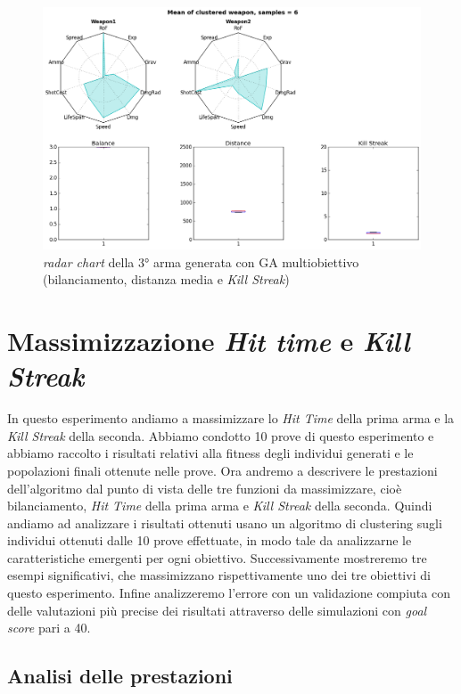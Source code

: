 \documentclass[12pt, italian]{toptesi}
\begin{document}
\begin{figure}[tp]
\centering
\includegraphics[width=1.0\textwidth]{rad_dist_kill_3}
\caption{\emph{radar chart} della 3°  arma generata con GA multiobiettivo (bilanciamento, distanza media e \emph{Kill Streak})}
\label{fig:rad_dist_kill_3}
\end{figure}

\section{Massimizzazione \emph{Hit time} e \emph{Kill Streak}}
\label{sec:delta_kill}

In questo esperimento andiamo a massimizzare lo \emph{Hit Time} della prima arma e la \emph{Kill Streak} della seconda.
Abbiamo condotto 10 prove di questo esperimento e abbiamo raccolto i risultati relativi alla fitness degli individui generati e le popolazioni finali ottenute nelle prove.
Ora andremo a descrivere le prestazioni dell'algoritmo dal punto di vista delle tre funzioni da massimizzare, cioè bilanciamento, \emph{Hit Time} della prima arma e \emph{Kill Streak} della seconda.
Quindi andiamo ad analizzare i risultati ottenuti usano un algoritmo di clustering sugli individui ottenuti dalle 10 prove effettuate, in modo tale da analizzarne le caratteristiche emergenti per ogni obiettivo.
Successivamente mostreremo tre esempi significativi, che massimizzano rispettivamente uno dei tre obiettivi di questo esperimento.
Infine analizzeremo l'errore con un validazione compiuta con delle valutazioni più precise dei risultati attraverso delle simulazioni con \emph{goal score} pari a 40.

\subsection{Analisi delle prestazioni}
\end{document}

